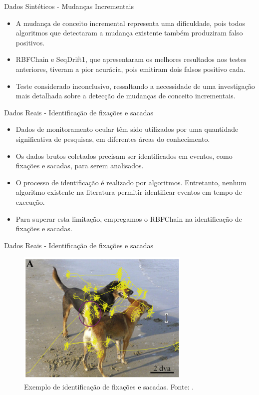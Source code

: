 \documentclass[10pt]{beamer}
\begin{document}
\begin{frame}{Dados Sintéticos -  Mudanças Incrementais}
    \begin{itemize}
        \item A mudança de conceito incremental representa uma dificuldade, pois todos algoritmos que detectaram a mudança existente também produziram falso positivos.
        \item RBFChain e SeqDrift1, que apresentaram os melhores resultados nos testes anteriores, tiveram a pior acurácia, pois emitiram dois falsos positivo cada.
        \item Teste considerado inconclusivo, ressaltando a necessidade de uma investigação mais detalhada sobre a detecção de mudanças de conceito incrementais.
    \end{itemize}
\end{frame}

\begin{frame}{Dados Reais - Identificação de fixações e sacadas}
    \begin{itemize}
        \item Dados de monitoramento ocular têm sido utilizados por uma quantidade significativa de pesquisas, em diferentes áreas do conhecimento.
        \item Os dados brutos coletados precisam ser identificados em eventos, como fixações e sacadas, para serem analisados.
        \item O processo de identificação é realizado por algoritmos. Entretanto, nenhum algoritmo existente na literatura permitir identificar eventos em tempo de execução.
        \item Para superar esta limitação, empregamos o RBFChain na identificação de fixações e sacadas.
    \end{itemize}
\end{frame}

\begin{frame}{Dados Reais - Identificação de fixações e sacadas}
    \begin{figure}[H]
        \begin{center}
            \includegraphics[scale=1]{imagens/exemplo_fixacao_e_sacadas.png}
            \caption{Exemplo de identificação de fixações e sacadas. Fonte: \cite{KONIG2014121}.}
            \label{fig:exemplo_fixacoes_e_sacadas}
        \end{center}
    \end{figure}
\end{frame}
\end{document}
